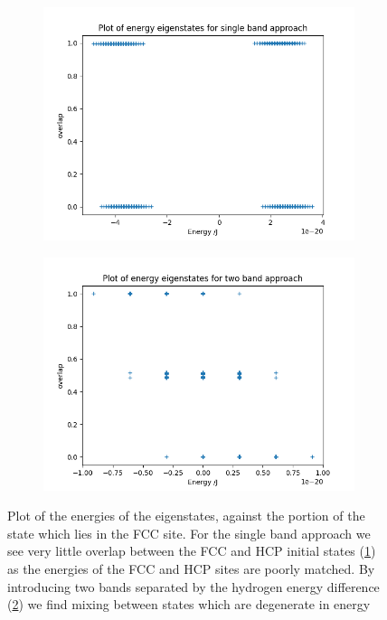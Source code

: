 \begin{figure}[htbp]
    \centering
    \begin{subfigure}{0.45\linewidth}
        \includegraphics[width=0.9\linewidth]{Figures/Simulation/single band eigenstate energies.png}
        \label{fig:one band overlap}
    \end{subfigure}
    \begin{subfigure}{0.45\linewidth}
        \includegraphics[width=0.9\linewidth]{Figures/Simulation/two band eigenstate energies.png}
        \label{fig:two band overlap}
    \end{subfigure}
    \caption{Plot of the energies of the
        eigenstates, against the portion of the
        state which lies in the FCC site.
        For the single band approach we
        see very little overlap between the FCC and HCP
        initial states (\cref{fig:one band overlap})
        as the energies of the FCC and HCP sites
        are poorly matched. By introducing
        two bands separated by the hydrogen energy
        difference (\cref{fig:two band overlap})
        we find mixing between states which are
        degenerate in energy
    }\label{fig:overlap with hydrogen energies}
\end{figure}

